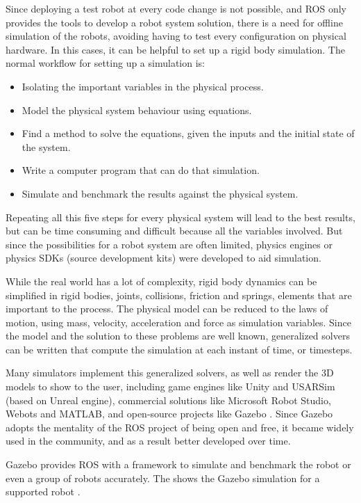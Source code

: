 Since deploying a test robot at every code change is not possible, and ROS only provides the tools to develop a robot system solution, there is a need for offline simulation of the robots, avoiding having to test every configuration on physical hardware. In this cases, it can be helpful to set up a rigid body simulation. The normal workflow for setting up a simulation is:

\begin{itemize}
    \item Isolating the important variables in the physical process.
    \item Model the physical system behaviour using equations.
    \item Find a method to solve the equations, given the inputs and the initial state of the system.
    \item Write a computer program that can do that simulation.
    \item Simulate and benchmark the results against the physical system.
\end{itemize}

Repeating all this five steps for every physical system will lead to the best results, but can be time consuming and difficult because all the variables involved. But since the possibilities for a robot system are often limited, physics engines or physics SDKs (source development kits) were developed to aid simulation.

While the real world has a lot of complexity, rigid body dynamics can be simplified in rigid bodies, joints, collisions, friction and springs, elements that are important to the process. The physical model can be reduced to the laws of motion, using mass, velocity, acceleration and force as simulation variables. Since the model and the solution to these problems are well known, generalized solvers can be written that compute the simulation at each instant of time, or timesteps.

Many simulators implement this generalized solvers, as well as render the 3D models to show to the user, including game engines like Unity and USARSim (based on Unreal engine), commercial solutions like Microsoft Robot Studio, Webots and MATLAB, and open-source projects like Gazebo \cite{craighead2007survey}. Since Gazebo adopts the mentality of the ROS project of being open and free, it became widely used in the community, and as a result better developed over time.

Gazebo provides ROS with a framework to simulate and benchmark the robot or even a group of robots accurately. The  shows the Gazebo simulation for a supported robot \cite{koenig2004design}.

